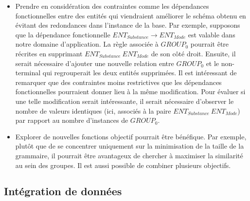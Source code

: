 \begin{itemize}
    \item Prendre en considération des contraintes comme les dépendances fonctionnelles entre des entités qui viendraient améliorer le schéma obtenu en évitant des redondances dans l'instance de la base.
    Par exemple, supposons que la dépendance fonctionnelle $ENT_{Substance} \rightarrow ENT_{Mode}$ est valable dans notre domaine d'application.
    La règle associée à $GROUP_0$ pourrait être récrites en supprimant $ENT_{Substance} ~ ENT_{Mode}$ de son côté droit.
    Ensuite, il serait nécessaire d'ajouter une nouvelle relation entre $GROUP_0$ et le non-terminal qui regrouperait les deux entités supprimées.
    Il est intéressant de remarquer que des contraintes moins restrictives que les dépendances fonctionnelles pourraient donner lieu à la même modification.
    Pour évaluer si une telle modification serait intéressante, il serait nécessaire d'observer le nombre de valeurs identiques (ici, associés à la paire $ENT_{Substance} ~ ENT_{Mode}$) par rapport au nombre d'instances de $GROUP_0$.

    \item Explorer de nouvelles fonctions objectif pourrait être bénéfique.
    Par exemple, plutôt que de se concentrer uniquement sur la minimisation de la taille de la grammaire, il pourrait être avantageux de chercher à maximiser la similarité au sein des groupes.
    Il est aussi possible de combiner plusieurs objectifs.
\end{itemize}

\subsection{Intégration de données}
\label{sec:struct:implem:integration}

